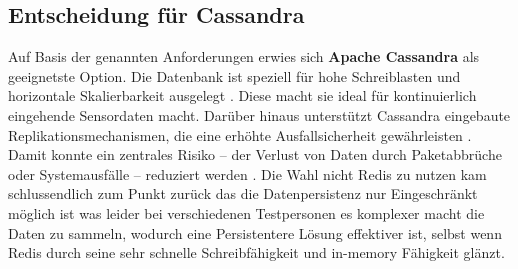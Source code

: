 \bgroup
\def\arraystretch{1.5}
\begin{table}[h]
	\centering
	\caption{Vergleich ausgewählter Datenbanksysteme \cite{ravi2024mysql, da2015redis, kabakus2017performance, lakshman2010cassandra, hewitt2010cassandra}}
	\label{tab:db-vergleich}
\end{table}
\egroup

\subsection{Entscheidung für Cassandra}

Auf Basis der genannten Anforderungen erwies sich \textbf{Apache Cassandra} als geeignetste Option. Die Datenbank ist speziell für hohe Schreiblasten und horizontale Skalierbarkeit ausgelegt \cite{cassandraHighLast}. Diese macht sie ideal für kontinuierlich eingehende Sensordaten macht. Darüber hinaus unterstützt Cassandra eingebaute Replikationsmechanismen, die eine erhöhte Ausfallsicherheit gewährleisten \cite{apacheCassandraBasics, cassandraHighLast}. Damit konnte ein zentrales Risiko – der Verlust von Daten durch Paketabbrüche oder Systemausfälle – reduziert werden \cite{apacheCassandraBasics}. Die Wahl nicht Redis zu nutzen kam schlussendlich zum Punkt zurück das die Datenpersistenz nur Eingeschränkt möglich ist was leider bei verschiedenen Testpersonen es komplexer macht die Daten zu sammeln, wodurch eine Persistentere Lösung effektiver ist, selbst wenn Redis durch seine sehr schnelle Schreibfähigkeit und in-memory Fähigkeit glänzt\cite{chen2016towards}.

